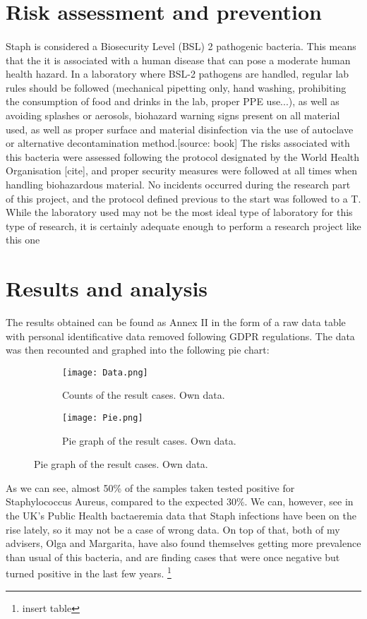 \section{Risk assessment and prevention}
\paragraph{}Staph is considered a Biosecurity Level (BSL) 2 pathogenic bacteria. This means that the it is associated with a human disease that can pose a moderate human health hazard. In a laboratory where BSL-2 pathogens are handled, regular lab rules should be followed (mechanical pipetting only, hand washing, prohibiting the consumption of food and drinks in the lab, proper PPE use...), as well as avoiding splashes or aerosols, biohazard warning signs present on all material used, as well as proper surface and material disinfection via the use of autoclave or alternative decontamination method.[source: book] The risks associated with this bacteria were assessed following the protocol designated by the World Health Organisation [cite], and proper security measures were followed at all times when handling biohazardous material. No incidents occurred during the research part of this project, and the protocol defined previous to the start was followed to a T. While the laboratory used may not be the most ideal type of laboratory for this type of research, it is certainly adequate enough to perform a research project like this one
\section{Results and analysis}
The results obtained can be found as Annex II in the form of a raw data table with personal identificative data removed following GDPR regulations. The data was then recounted and graphed into the following pie chart: 
\begin{center}\begin{figure}[h!]  \centering\begin{subfigure}[b]{0.4\linewidth}\texttt{[image: Data.png]}\caption{Counts of the result cases. Own data.}\end{subfigure}\begin{subfigure}[b]{0.4\linewidth}\texttt{[image: Pie.png]}\caption{Pie graph of the result cases. Own data.}\end{subfigure}\end{figure}\end{center}
As we can see, almost 50\% of the samples taken tested positive for Staphylococcus Aureus, compared to the expected 30\%\cite{StaphylococcusAureusHealthcare2020}. We can, however, see in the UK's Public Health bactaeremia data that Staph infections have been on the rise lately, so it may not be a case of wrong data\cite{englandMSSABacteraemiaAnnual2021}. On top of that, both of my advisers, Olga and Margarita, have also found themselves getting more prevalence than usual of this bacteria, and are finding cases that were once negative but turned positive in the last few years. \footnote{insert table}
